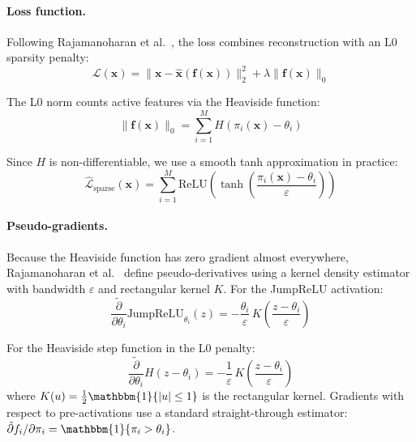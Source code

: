 \documentclass[runningheads]{llncs}
\begin{document}
\paragraph{Loss function.} Following Rajamanoharan et al.~\cite{ref_rajamanoharan2024}, the loss combines reconstruction with an L0 sparsity penalty:
\begin{equation}
\mathcal{L}(\mathbf{x}) = \|\mathbf{x} - \hat{\mathbf{x}}(\mathbf{f}(\mathbf{x}))\|_2^2 + \lambda \|\mathbf{f}(\mathbf{x})\|_0
\end{equation}

The L0 norm counts active features via the Heaviside function:
\begin{equation}
\|\mathbf{f}(\mathbf{x})\|_0 = \sum_{i=1}^{M} H(\pi_i(\mathbf{x}) - \theta_i)
\end{equation}

Since $H$ is non-differentiable, we use a smooth tanh approximation in practice:
\begin{equation}
\hat{\mathcal{L}}_\text{sparse}(\mathbf{x}) = \sum_{i=1}^{M} \text{ReLU}\!\left(\tanh\!\left(\frac{\pi_i(\mathbf{x}) - \theta_i}{\varepsilon}\right)\right)
\end{equation}

\paragraph{Pseudo-gradients.} Because the Heaviside function has zero gradient almost everywhere, Rajamanoharan et al.~\cite{ref_rajamanoharan2024} define pseudo-derivatives using a kernel density estimator with bandwidth $\varepsilon$ and rectangular kernel $K$. For the JumpReLU activation:
\begin{equation}
\frac{\tilde{\partial}}{\partial \theta_i} \text{JumpReLU}_{\theta_i}(z) = -\frac{\theta_i}{\varepsilon}\, K\!\left(\frac{z - \theta_i}{\varepsilon}\right)
\end{equation}

For the Heaviside step function in the L0 penalty:
\begin{equation}
\frac{\tilde{\partial}}{\partial \theta_i} H(z - \theta_i) = -\frac{1}{\varepsilon}\, K\!\left(\frac{z - \theta_i}{\varepsilon}\right)
\end{equation}
where $K(u) = \frac{1}{2}\mathbbm{1}\{|u| \leq 1\}$ is the rectangular kernel. Gradients with respect to pre-activations use a standard straight-through estimator: $\tilde{\partial} f_i / \partial \pi_i = \mathbbm{1}\{\pi_i > \theta_i\}$.
\end{document}
